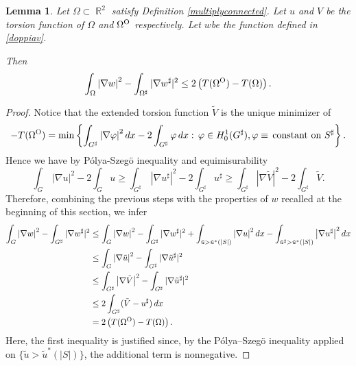 \documentclass[oneside,a4paper,11pt,notitlepage]{article}
\newcommand{\abs}[1]{{\left|#1\right|}}
\theoremstyle{definition}
\theoremstyle{plain}
\newtheorem{lemma}[theorem]{Lemma}
\theoremstyle{definition}
\DeclareMathOperator{\R}{\mathbb{R}}
\newcommand{\OO}{\text{\normalfont  O}}
\begin{document}
\begin{lemma}
\label{lem_grad}
     Let $\Omega\subset\R^2$ satisfy Definition \ref{multiplyconnected}. Let $u$ and $V$ be the torsion function of $\Omega$ and $\Omega^\OO$ respectively. Let $w$be the function defined in \eqref{doppiav}.
     
     Then 
\begin{equation}
\label{tops}
\int_{\Omega}\abs{\nabla w}^2-\int_{\Omega^\sharp}|\nabla w^\sharp|^2\leq 2\left(T(\Omega^\OO) - T(\Omega)\right).
\end{equation}
\end{lemma}
\begin{proof}
Notice that the extended torsion function $\tilde V$  is the unique minimizer of
\begin{equation*}
    -T(\Omega^\OO)= \min\left\{\int_{G^\sharp}\abs{\nabla\varphi}^2\,dx - 2\int_{G^\sharp} \varphi\, dx  : \, \varphi \in H^1_0(G^\sharp), \varphi\equiv  \, \text{constant on }  S^\sharp \right\}.
\end{equation*}
Hence we have  by P\'olya-Szeg\"o inequality and equimisurability
\begin{equation*}
\int_G\,|\nabla u|^2-2\int_{G} u\geq \int_{G^{\sharp}}\,|\nabla u^\sharp|^2-2\int_{G^\sharp} u^\sharp\geq \int_{G^{\sharp}}\abs{\nabla \tilde V}^2-2\int_{G^\sharp}\tilde V.
\end{equation*}
 Therefore, combining the previous steps with the properties of $w$ recalled at the beginning of this section, we infer
\begin{equation*}
    \begin{aligned}
\int_{G}\abs{\nabla w}^2-\int_{G^\sharp}|\nabla w^\sharp|^2 
&\leq\int_{G}\abs{\nabla w}^2-\int_{G^\sharp}|\nabla w^\sharp|^2+\int_{\tilde u>\tilde u^\ast(\abs{S})}\abs{\nabla u}^2\,dx-\int_{\tilde u^\sharp>\tilde u^\ast(\abs{S})}\abs{\nabla u^\sharp}^2\,dx
\\
&\leq \int_{G}\abs{\nabla\tilde u}^2-\int_{G^\sharp}|\nabla\tilde u^\sharp|^2 \\ 
&\leq \int_{G^\sharp}\abs{\nabla\tilde V}^2-\int_{G^\sharp}|\nabla\tilde u^\sharp|^2\\
&\leq 2\int_{G^\sharp}(\tilde V-u^\sharp) \, dx\\
&= 2 \left( T(\Omega^\OO) - T(\Omega)\right) .
\end{aligned}
\end{equation*}
Here, the first inequality is justified since, by the P\'olya--Szeg\"o inequality applied on $\{\tilde u>\tilde u^\ast(\abs{S})\}$, the additional term is nonnegative.
\end{proof}
\end{document}
